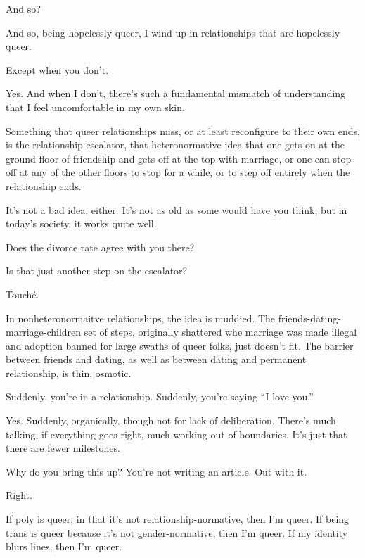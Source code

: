 \begin{leftcolumn}
\begin{ally}
And so?
\end{ally}
And so, being hopelessly queer, I wind up in relationships that are hopelessly queer.

\begin{ally}
Except when you don't.
\end{ally}
Yes. And when I don't, there's such a fundamental mismatch of understanding that I feel uncomfortable in my own skin.

Something that queer relationships miss, or at least reconfigure to their own ends, is the relationship escalator, that heteronormative idea that one gets on at the ground floor of friendship and gets off at the top with marriage, or one can stop off at any of the other floors to stop for a while, or to step off entirely when the relationship ends.

It's not a bad idea, either. It's not as old as some would have you think, but in today's society, it works quite well.

\begin{ally}
Does the divorce rate agree with you there?
\end{ally}
Is that just another step on the escalator?

\begin{ally}
Touché.
\end{ally}
In nonheteronormaitve relationships, the idea is muddied. The friends-dating-marriage-children set of steps, originally shattered whe marriage was made illegal and adoption banned for large swaths of queer folks, just doesn't fit. The barrier between friends and dating, as well as between dating and permanent relationship, is thin, osmotic.

\begin{ally}
Suddenly, you're in a relationship. Suddenly, you're saying ``I love you.''
\end{ally}
Yes. Suddenly, organically, though not for lack of deliberation. There's much talking, if everything goes right, much working out of boundaries. It's just that there are fewer milestones.

\begin{ally}
Why do you bring this up? You're not writing an article. Out with it.
\end{ally}
Right.
\newpage

If poly is queer, in that it's not relationship-normative, then I'm queer. If being trans is queer because it's not gender-normative, then I'm queer. If my identity blurs lines, then I'm queer.


\end{leftcolumn}
